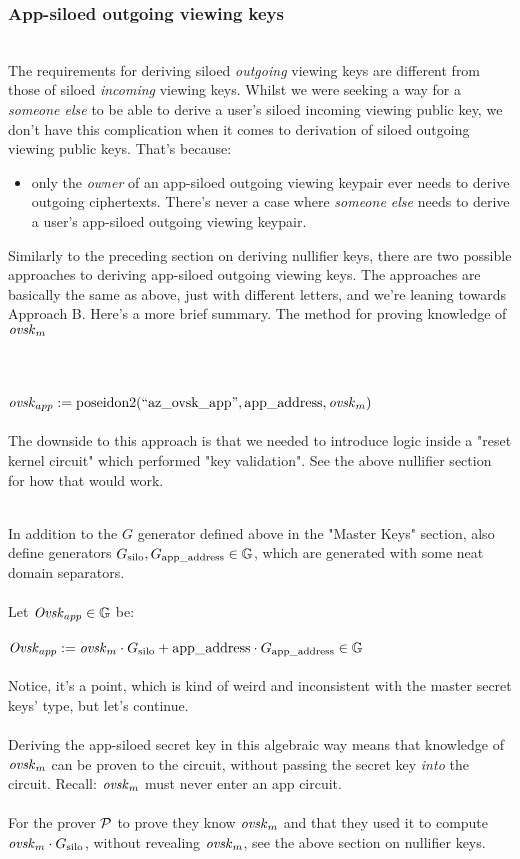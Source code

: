 \subsubsection{App-siloed outgoing viewing keys}\hfill\\

The requirements for deriving siloed \textit{outgoing} viewing keys are different from those of siloed \textit{incoming} viewing keys.
Whilst we were seeking a way for a \textit{someone else} to be able to derive a user's siloed incoming viewing public key, we don't have this complication when it comes to derivation of siloed outgoing viewing public keys.
That's because:
\begin{itemize}
    \item only the \textit{owner} of an app-siloed outgoing viewing keypair ever needs to derive outgoing ciphertexts. There's never a case where \textit{someone else} needs to derive a user's app-siloed outgoing viewing keypair.
\end{itemize}
\noindent
Similarly to the preceding section on deriving nullifier keys, there are two possible approaches to deriving app-siloed outgoing viewing keys.
The approaches are basically the same as above, just with different letters, and we're leaning towards Approach B.
Here's a more brief summary.
The method for proving knowledge of $\ovskm$\\
\\
\hfill\\
\\
$\ovskapp := \poseidon(\text{``az\_ovsk\_app''}, \appaddress, \ovskm)$\\
\\
The downside to this approach is that we needed to introduce logic inside a "reset kernel circuit" which performed "key validation".
See the above nullifier section for how that would work.

\hfill\\
In addition to the $G$ generator defined above in the "Master Keys" section, also define generators $\Gsilo, \Gappaddress \in \G$, which are generated with some neat domain separators.\\
\\
Let $\Ovskapp \in \G$ be:\\
\\
$\Ovskapp := \ovskm \cdot \Gsilo + \appaddress \cdot \Gappaddress \in \G$\\
\\
Notice, it's a point, which is kind of weird and inconsistent with the master secret keys' type, but let's continue.\\
\\
Deriving the app-siloed secret key in this algebraic way means that knowledge of $\ovskm$ can be proven to the circuit, without passing the secret key \textit{into} the circuit.
Recall: $\ovskm$ must never enter an app circuit.\\
\\
For the prover $\P$ to prove they know $\ovskm$ and that they used it to compute $\ovskm \cdot \Gsilo$, without revealing $\ovskm$, see the above section on nullifier keys.




